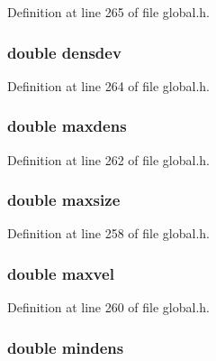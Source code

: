 Definition at line 265 of file global.\-h.

\hypertarget{structstatisticsData_a62a3935a35dda8e375bf0ec6cc160d5e}{
\subsubsection[{densdev}]{\setlength{\rightskip}{0pt plus 5cm}double densdev}}\label{structstatisticsData_a62a3935a35dda8e375bf0ec6cc160d5e}


Definition at line 264 of file global.\-h.

\hypertarget{structstatisticsData_abc8b83844f3405d9046189aa841b48fd}{
\subsubsection[{maxdens}]{\setlength{\rightskip}{0pt plus 5cm}double maxdens}}\label{structstatisticsData_abc8b83844f3405d9046189aa841b48fd}


Definition at line 262 of file global.\-h.

\hypertarget{structstatisticsData_a7383c898fd4cd4d862ca65d3713086cd}{
\subsubsection[{maxsize}]{\setlength{\rightskip}{0pt plus 5cm}double maxsize}}\label{structstatisticsData_a7383c898fd4cd4d862ca65d3713086cd}


Definition at line 258 of file global.\-h.

\hypertarget{structstatisticsData_a485292d20f5d14bd18e83fef65976fb4}{
\subsubsection[{maxvel}]{\setlength{\rightskip}{0pt plus 5cm}double maxvel}}\label{structstatisticsData_a485292d20f5d14bd18e83fef65976fb4}


Definition at line 260 of file global.\-h.

\hypertarget{structstatisticsData_a2ddb05b9ae611dab07eef62db427ed61}{
\subsubsection[{mindens}]{\setlength{\rightskip}{0pt plus 5cm}double mindens}}\label{structstatisticsData_a2ddb05b9ae611dab07eef62db427ed61}


